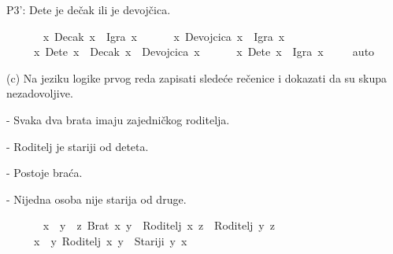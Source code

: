 \begin{isabellebody}
\begin{exercise}[subtitle=Zapisivanje logičkih formula (nastavak)]
\begin{isamarkuptext}%
P3': Dete je dečak ili je devojčica.%
\end{isamarkuptext}\isamarkuptrue%
\isamarkupfalse%
\ {\isachardoublequoteopen}\isanewline
\ \ \ \ {\isacharparenleft}{\kern0pt}{\isasymforall}\ x{\isachardot}{\kern0pt}\ Decak\ x\ {\isasymlongrightarrow}\ Igra\ x{\isacharparenright}{\kern0pt}\ {\isasymand}\isanewline
\ \ \ \ {\isacharparenleft}{\kern0pt}{\isasymforall}\ x{\isachardot}{\kern0pt}\ Devojcica\ x\ {\isasymlongrightarrow}\ Igra\ x{\isacharparenright}{\kern0pt}\ {\isasymand}\isanewline
\ \ \ \ {\isacharparenleft}{\kern0pt}{\isasymforall}\ x{\isachardot}{\kern0pt}\ Dete\ x\ {\isasymlongrightarrow}\ Decak\ x\ {\isasymor}\ Devojcica\ x{\isacharparenright}{\kern0pt}\ {\isasymlongrightarrow}\isanewline
\ \ \ \ {\isacharparenleft}{\kern0pt}{\isasymforall}\ x{\isachardot}{\kern0pt}\ Dete\ x\ {\isasymlongrightarrow}\ Igra\ x{\isacharparenright}{\kern0pt}\ {\isachardoublequoteclose}\isanewline
%
\isadelimproof
\ \ %
\endisadelimproof
%
\isatagproof
{}\isamarkupfalse%
\ auto%
\endisatagproof
{\isafoldproof}%
%
\isadelimproof
%
\endisadelimproof
%
\begin{isamarkuptext}%
(c) Na jeziku logike prvog reda zapisati sledeće rečenice i dokazati da su skupa nezadovoljive.%
\end{isamarkuptext}\isamarkuptrue%
%
\begin{isamarkuptext}%
- Svaka dva brata imaju zajedničkog roditelja.%
\end{isamarkuptext}\isamarkuptrue%
%
\begin{isamarkuptext}%
- Roditelj je stariji od deteta.%
\end{isamarkuptext}\isamarkuptrue%
%
\begin{isamarkuptext}%
- Postoje braća.%
\end{isamarkuptext}\isamarkuptrue%
%
\begin{isamarkuptext}%
- Nijedna osoba nije starija od druge.%
\end{isamarkuptext}\isamarkuptrue%
\isamarkupfalse%
\ {\isachardoublequoteopen}\isanewline
\ \ \ \ {\isacharparenleft}{\kern0pt}{\isasymforall}\ x{\isachardot}{\kern0pt}\ {\isasymforall}\ y{\isachardot}{\kern0pt}\ {\isasymexists}\ z{\isachardot}{\kern0pt}\ Brat\ x\ y\ {\isasymlongrightarrow}\ Roditelj\ x\ z\ {\isasymand}\ Roditelj\ y\ z{\isacharparenright}{\kern0pt}\ {\isasymand}\isanewline
\ \ \ \ {\isacharparenleft}{\kern0pt}{\isasymforall}\ x{\isachardot}{\kern0pt}\ {\isasymforall}\ y{\isachardot}{\kern0pt}\ Roditelj\ x\ y\ {\isasymlongrightarrow}\ Stariji\ y\ x{\isacharparenright}{\kern0pt}\ {\isasymand}\isanewline

\end{exercise}
\end{isabellebody}
